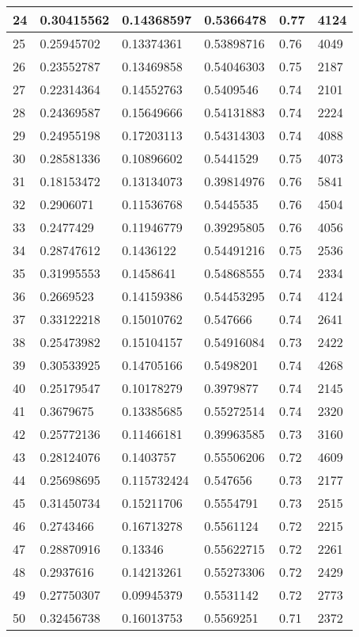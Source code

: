 \begin{longtable}{|l|l|l|l|l|l|}
24 & 0.30415562 & 0.14368597 & 0.5366478 & 0.77 & 4124 \\ \hline 
25 & 0.25945702 & 0.13374361 & 0.53898716 & 0.76 & 4049 \\ \hline 
26 & 0.23552787 & 0.13469858 & 0.54046303 & 0.75 & 2187 \\ \hline 
27 & 0.22314364 & 0.14552763 & 0.5409546 & 0.74 & 2101 \\ \hline 
28 & 0.24369587 & 0.15649666 & 0.54131883 & 0.74 & 2224 \\ \hline 
29 & 0.24955198 & 0.17203113 & 0.54314303 & 0.74 & 4088 \\ \hline 
30 & 0.28581336 & 0.10896602 & 0.5441529 & 0.75 & 4073 \\ \hline 
31 & 0.18153472 & 0.13134073 & 0.39814976 & 0.76 & 5841 \\ \hline 
32 & 0.2906071 & 0.11536768 & 0.5445535 & 0.76 & 4504 \\ \hline 
33 & 0.2477429 & 0.11946779 & 0.39295805 & 0.76 & 4056 \\ \hline 
34 & 0.28747612 & 0.1436122 & 0.54491216 & 0.75 & 2536 \\ \hline 
35 & 0.31995553 & 0.1458641 & 0.54868555 & 0.74 & 2334 \\ \hline 
36 & 0.2669523 & 0.14159386 & 0.54453295 & 0.74 & 4124 \\ \hline 
37 & 0.33122218 & 0.15010762 & 0.547666 & 0.74 & 2641 \\ \hline 
38 & 0.25473982 & 0.15104157 & 0.54916084 & 0.73 & 2422 \\ \hline 
39 & 0.30533925 & 0.14705166 & 0.5498201 & 0.74 & 4268 \\ \hline 
40 & 0.25179547 & 0.10178279 & 0.3979877 & 0.74 & 2145 \\ \hline 
41 & 0.3679675 & 0.13385685 & 0.55272514 & 0.74 & 2320 \\ \hline 
42 & 0.25772136 & 0.11466181 & 0.39963585 & 0.73 & 3160 \\ \hline 
43 & 0.28124076 & 0.1403757 & 0.55506206 & 0.72 & 4609 \\ \hline 
44 & 0.25698695 & 0.115732424 & 0.547656 & 0.73 & 2177 \\ \hline 
45 & 0.31450734 & 0.15211706 & 0.5554791 & 0.73 & 2515 \\ \hline 
46 & 0.2743466 & 0.16713278 & 0.5561124 & 0.72 & 2215 \\ \hline 
47 & 0.28870916 & 0.13346 & 0.55622715 & 0.72 & 2261 \\ \hline 
48 & 0.2937616 & 0.14213261 & 0.55273306 & 0.72 & 2429 \\ \hline 
49 & 0.27750307 & 0.09945379 & 0.5531142 & 0.72 & 2773 \\ \hline 
50 & 0.32456738 & 0.16013753 & 0.5569251 & 0.71 & 2372 \\ \hline 
\end{longtable}